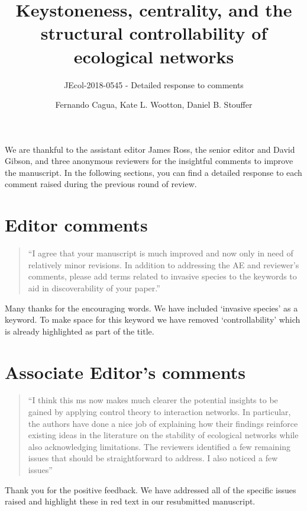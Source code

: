 \documentclass[a4paper]{artikel1}
\title{Keystoneness, centrality, and the structural controllability of
ecological networks}
\subtitle{JEcol-2018-0545 - Detailed response to comments}
\author{Fernando Cagua, Kate L. Wootton, Daniel B. Stouffer}
\date{}
\theoremstyle{definition}
\theoremstyle{definition}
\theoremstyle{definition}
\theoremstyle{remark}
\begin{document}
\maketitle

\renewcommand\thefigure{R\arabic{figure}}    

\setcounter{figure}{0}

\doublespacing

We are thankful to the assistant editor James Ross, the senior editor
and David Gibson, and three anonymous reviewers for the insightful
comments to improve the manuscript. In the following sections, you can
find a detailed response to each comment raised during the previous
round of review.

\section{Editor comments}\label{editor-comments}

\begin{quote}
``I agree that your manuscript is much improved and now only in need of
relatively minor revisions. In addition to addressing the AE and
reviewer's comments, please add terms related to invasive species to the
keywords to aid in discoverability of your paper.''
\end{quote}

Many thanks for the encouraging words. We have included `invasive
species' as a keyword. To make space for this keyword we have removed
`controllability' which is already highlighted as part of the title.

\section{Associate Editor's comments}\label{associate-editors-comments}

\begin{quote}
``I think this ms now makes much clearer the potential insights to be
gained by applying control theory to interaction networks. In
particular, the authors have done a nice job of explaining how their
findings reinforce existing ideas in the literature on the stability of
ecological networks while also acknowledging limitations. The reviewers
identified a few remaining issues that should be straightforward to
address. I also noticed a few issues''
\end{quote}

Thank you for the positive feedback. We have addressed all of the
specific issues raised and highlight these in red text in our
resubmitted manuscript.
\end{document}
